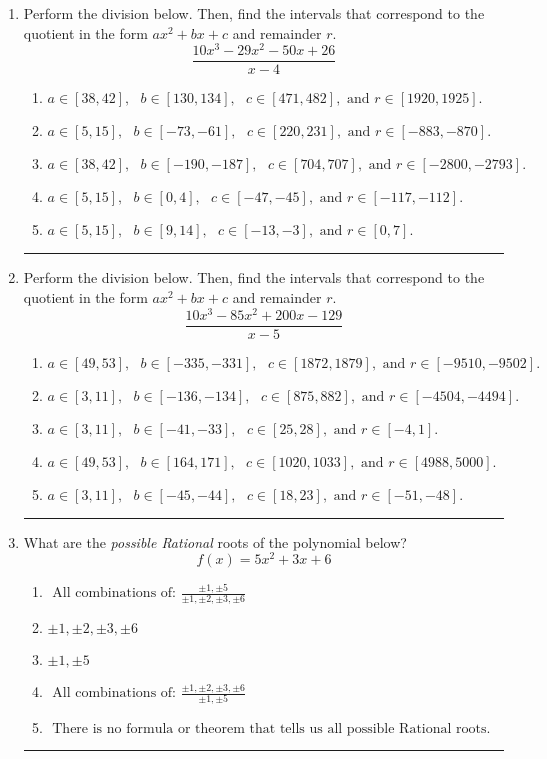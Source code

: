 \documentclass[14pt]{extbook}
\newcommand{\litem}[1]{\item#1\hspace*{-1cm}\rule{\textwidth}{0.4pt}}
\begin{document}
\begin{enumerate}
{\begin{enumerate}[label=\Alph*.]
\end{enumerate} }
\litem{
Perform the division below. Then, find the intervals that correspond to the quotient in the form $ax^2+bx+c$ and remainder $r$.\[ \frac{10x^{3} -29 x^{2} -50 x + 26}{x -4} \]\begin{enumerate}[label=\Alph*.]
\item \( a \in [38, 42], \text{   } b \in [130, 134], \text{   } c \in [471, 482], \text{   and   } r \in [1920, 1925]. \)
\item \( a \in [5, 15], \text{   } b \in [-73, -61], \text{   } c \in [220, 231], \text{   and   } r \in [-883, -870]. \)
\item \( a \in [38, 42], \text{   } b \in [-190, -187], \text{   } c \in [704, 707], \text{   and   } r \in [-2800, -2793]. \)
\item \( a \in [5, 15], \text{   } b \in [0, 4], \text{   } c \in [-47, -45], \text{   and   } r \in [-117, -112]. \)
\item \( a \in [5, 15], \text{   } b \in [9, 14], \text{   } c \in [-13, -3], \text{   and   } r \in [0, 7]. \)

\end{enumerate} }
\litem{
Perform the division below. Then, find the intervals that correspond to the quotient in the form $ax^2+bx+c$ and remainder $r$.\[ \frac{10x^{3} -85 x^{2} +200 x -129}{x -5} \]\begin{enumerate}[label=\Alph*.]
\item \( a \in [49, 53], \text{   } b \in [-335, -331], \text{   } c \in [1872, 1879], \text{   and   } r \in [-9510, -9502]. \)
\item \( a \in [3, 11], \text{   } b \in [-136, -134], \text{   } c \in [875, 882], \text{   and   } r \in [-4504, -4494]. \)
\item \( a \in [3, 11], \text{   } b \in [-41, -33], \text{   } c \in [25, 28], \text{   and   } r \in [-4, 1]. \)
\item \( a \in [49, 53], \text{   } b \in [164, 171], \text{   } c \in [1020, 1033], \text{   and   } r \in [4988, 5000]. \)
\item \( a \in [3, 11], \text{   } b \in [-45, -44], \text{   } c \in [18, 23], \text{   and   } r \in [-51, -48]. \)

\end{enumerate} }
\litem{
What are the \textit{possible Rational} roots of the polynomial below?\[ f(x) = 5x^{2} +3 x + 6 \]\begin{enumerate}[label=\Alph*.]
\item \( \text{ All combinations of: }\frac{\pm 1,\pm 5}{\pm 1,\pm 2,\pm 3,\pm 6} \)
\item \( \pm 1,\pm 2,\pm 3,\pm 6 \)
\item \( \pm 1,\pm 5 \)
\item \( \text{ All combinations of: }\frac{\pm 1,\pm 2,\pm 3,\pm 6}{\pm 1,\pm 5} \)
\item \( \text{ There is no formula or theorem that tells us all possible Rational roots.} \)


\end{enumerate}}
\end{enumerate}
\end{document}
